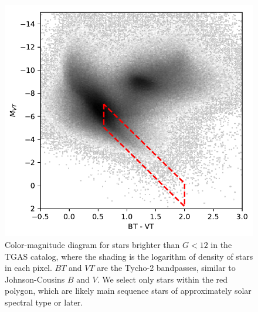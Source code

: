 \begin{figure}
\begin{center}
\includegraphics[scale=0.65]{gaia/hr.pdf}
\end{center}
\caption{Color-magnitude diagram for stars brighter than $G < 12$ in the TGAS catalog, where the shading is the logarithm of density of stars in each pixel. $BT$ and $VT$ are the Tycho-2 bandpasses,  similar to Johnson-Cousins $B$ and $V$. We select only stars within the red polygon, which are likely main sequence stars of approximately solar spectral type or later.} \label{fig:hr}
\end{figure}

